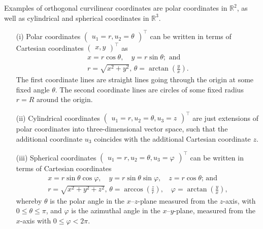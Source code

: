 {
\color{blue}
\bexample

Examples of orthogonal curvilinear coordinates
are polar coordinates in $\mathbb{R}^2$,
as well as cylindrical and spherical coordinates in $\mathbb{R}^3$.

\begin{itemize}
\item[(i)]
Polar coordinates
$\begin{pmatrix}
u_1=r, u_2=\theta
\end{pmatrix}^\intercal$
can be written in terms of Cartesian coordinates
$\begin{pmatrix}
x,y \end{pmatrix}^\intercal$ as
\begin{equation}
\begin{split}
x = r \cos \theta ,\quad
y = r \sin \theta   ;\text{ and}\quad   \\
r=\sqrt{x^2+y^2}\text{, }
\theta = \arctan \left(\frac{y}{x}\right)
.
\end{split}
\label{2018-mm-ch-pc}
\end{equation}
The first coordinate lines
are straight lines going through the origin at some fixed angle $\theta $.
The second coordinate lines
are circles of some fixed radius $r=R$ around the origin.

\item[(ii)]
Cylindrical coordinates
$\begin{pmatrix}
u_1=r, u_2=\theta, u_3=z
\end{pmatrix}^\intercal$
are just extensions of polar coordinates into three-dimensional vector space, such that the additional coordinate
$u_3$ coincides with the additional Cartesian coordinate $z$.

\item[(iii)]
Spherical coordinates
$\begin{pmatrix}
u_1=r, u_2=\theta, u_3=\varphi
\end{pmatrix}^\intercal$
can be written in terms of Cartesian coordinates
\begin{equation}
\begin{split}
x  = r\sin \theta \cos \varphi , \quad
y = r\sin \theta \sin \varphi ,  \quad
z = r\cos \theta  \text{; and}\\
r=\sqrt{x^2+y^2+z^2}\text{, }
\theta = \arccos \left(\frac{z}{r}\right), \quad
\varphi=  \arctan \left(\frac{y}{x}\right),
\end{split}
\label{2018-mm-ch-sc}
\end{equation}
whereby  $\theta$ is the polar angle in the $x$--$z$-plane measured
from the $z$-axis, with $0 \le \theta \le \pi$,
and $\varphi $ is  the azimuthal angle in the $x$--$y$-plane, measured
from the $x$-axis with $0 \le \varphi < 2 \pi$.
\end{itemize}

}
